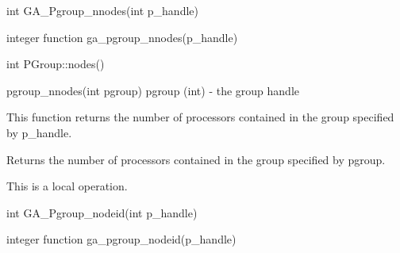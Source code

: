 \documentclass[12pt]{article}
\begin{document}
\begin{capi}
\begin{ccode}
int GA_Pgroup_nnodes(int p_handle)
\end{ccode}
\begin{funcargs}
\end{funcargs}
\end{capi}

\begin{fapi}
\begin{fcode}
integer function ga_pgroup_nnodes(p_handle)
\end{fcode}
\begin{funcargs}
\end{funcargs}
\end{fapi}

\begin{cxxapi}
\begin{cxxcode}
int PGroup::nodes()
\end{cxxcode}
\end{cxxapi}

\begin{pyapi}
\begin{pycode}
pgroup_nnodes(int pgroup)
   pgroup (int)                  - the group handle
\end{pycode}
\end{pyapi}

\local
\begin{desc}

This function returns the number of processors contained in the group specified by p_handle.

Returns the number of processors contained in the group specified by
pgroup.

This is a local operation.
\end{desc}


\begin{capi}
\begin{ccode}
int GA_Pgroup_nodeid(int p_handle)
\end{ccode}
\begin{funcargs}
\end{funcargs}
\end{capi}

\begin{fapi}
\begin{fcode}
integer function ga_pgroup_nodeid(p_handle)
\end{fcode}
\begin{funcargs}
\end{funcargs}
\end{fapi}
\end{document}
